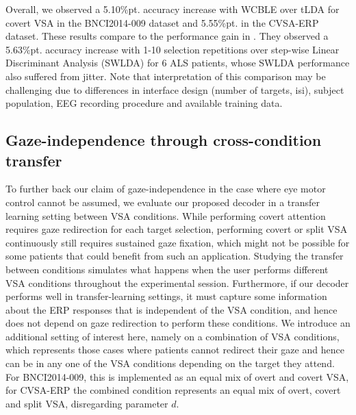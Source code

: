 Overall, we observed a 5.10\%pt. accuracy increase with WCBLE over
tLDA for covert VSA in the BNCI2014-009 dataset and 5.55\%pt. in the CVSA-ERP dataset.
These results compare to the performance gain in \cite{Zisk2022}.
They observed a 5.63\%pt. accuracy increase with 1-10 selection repetitions over
step-wise Linear Discriminant Analysis  (SWLDA) for 6 ALS patients, whose SWLDA
performance also suffered from jitter.
Note that interpretation of this comparison may be challenging due to differences in
interface design (number of targets, \ac{isi}), subject population,
EEG recording procedure and available training data.


\subsection{Gaze-independence through cross-condition transfer}
\label{sec:cross_results}
To further back our claim of gaze-independence in the case where eye motor
control cannot be assumed, we evaluate our proposed decoder in a transfer
learning setting between VSA conditions.
While performing covert attention requires gaze redirection for each target
selection, performing covert or split VSA continuously still requires
sustained gaze fixation, which might not be possible for some patients that
could benefit from such an application.
Studying the transfer between conditions simulates what happens
when the user performs different VSA conditions throughout the
experimental session.
Furthermore, if our decoder performs well in transfer-learning settings,
it must capture some information about the ERP responses that is independent of
the VSA condition, and hence does not depend on gaze redirection to perform
these conditions.
We introduce an additional setting of interest here, namely on a combination of VSA
conditions, which represents those cases where patients cannot
redirect their gaze and hence can be in any one of the VSA conditions depending on the
target they attend.
For BNCI2014-009, this is implemented as an equal mix of overt and
covert VSA, for CVSA-ERP the combined condition represents an equal mix of overt,
covert and split VSA, disregarding parameter $d$.

